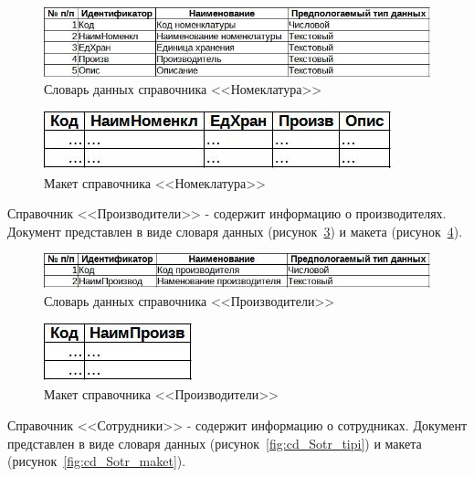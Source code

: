 \documentclass[12pt, a4paper, simple]{eskdtext}
\begin{document}
    \begin{figure}[p!]
        \centering
        \includegraphics[width=16cm]
            {_docs/СД_Номенкл_типы.jpg}
        \caption{Словарь данных справочника <<Номеклатура>>}
        \label{fig:cd_Nomenkl_tipi}
    \end{figure}

    \begin{figure}[p!]
        \centering
        \includegraphics[]
            {_docs/СД_Номенкл_макет.jpg}
        \caption{Макет справочника <<Номеклатура>>}
        \label{fig:cd_Nomenkl_maket}
    \end{figure}

    Справочник <<Производители>> - содержит информацию о производителях.
    Документ представлен в виде словаря данных (рисунок~\ref{fig:cd_Proizv_tipi})
    и макета (рисунок~\ref{fig:cd_Proizv_maket}).

    \begin{figure}[!h]
        \centering
        \includegraphics[width=16cm]
            {_docs/СД_Произв_типы.jpg}
        \caption{Словарь данных справочника <<Производители>>}
        \label{fig:cd_Proizv_tipi}
    \end{figure}

    \begin{figure}[!h]
        \centering
        \includegraphics[]
            {_docs/СД_Произв_макет.jpg}
        \caption{Макет справочника <<Производители>>}
        \label{fig:cd_Proizv_maket}
    \end{figure}

    Справочник <<Сотрудники>> - содержит информацию о сотрудниках.
    Документ представлен в виде словаря данных (рисунок~\ref{fig:cd_Sotr_tipi})
    и макета (рисунок~\ref{fig:cd_Sotr_maket}).
\end{document}
